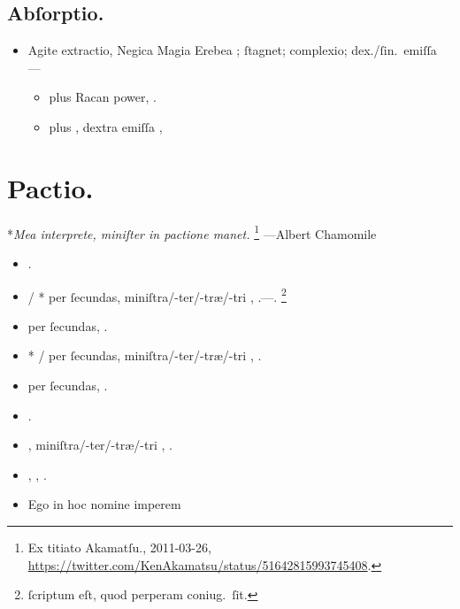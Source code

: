 \documentclass[12pt]{book}
\newcommand{\reconst}{*}
\begin{document}
\section{Abſorptio.}\label{absorptio}

\begin{itemize}
  \item Agite extractio, Negica Magia Erebea ; ſtagnet; complexio; dex./ſin.\ emiſſa ---
  \begin{itemize}
    \item \textelp{} plus \textenglish{Racan power}, .
    \item \textelp{} plus , dextra emiſſa , \textelp{}
  \end{itemize}
\end{itemize}


\chapter{Pactio.}\label{pactio}

\reconst{}\emph{Mea interprete, miniſter  in pactione manet.}%
\footnote{%
  Ex titiato Akamatſu., 2011-03-26,
  \url{https://twitter.com/KenAkamatsu/status/51642815993745408}.
}
---Albert Chamomile

\begin{itemize}
  \item {}.
  \item {} /
        \reconst{}
        per  ſecundas,
        miniſtra/-ter/-træ/-tri , .---.%
        \footnote{
           ſcriptum eſt, quod perperam coniug.\ ſit.
        }
  \item {} per  ſecundas, .
  \item \reconst{} /
         per  ſecundas, miniſtra/-ter/-træ/-tri , .
  \item {} per  ſecundas, .
  \item {}.
  \item {}, miniſtra/-ter/-træ/-tri , .
  \item {}, , .
  \item Ego  in hoc nomine imperem \textelp{}

\end{itemize}
\end{document}
